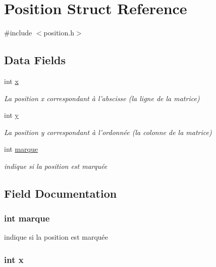 \hypertarget{struct_position}{\section{Position Struct Reference}
\label{struct_position}
}


{\ttfamily \#include $<$position.\-h$>$}

\subsection*{Data Fields}
\begin{DoxyCompactItemize}
\item 
int \hyperlink{struct_position_a6150e0515f7202e2fb518f7206ed97dc}{x}
\begin{DoxyCompactList}\small\item\em La position x correspondant à l'abscisse (la ligne de la matrice) \end{DoxyCompactList}\item 
int \hyperlink{struct_position_a0a2f84ed7838f07779ae24c5a9086d33}{y}
\begin{DoxyCompactList}\small\item\em La position y correspondant à l'ordonnée (la colonne de la matrice) \end{DoxyCompactList}\item 
int \hyperlink{struct_position_ace542d9352425b4ca6966353f6d656cf}{marque}
\begin{DoxyCompactList}\small\item\em indique si la position est marquée \end{DoxyCompactList}\end{DoxyCompactItemize}


\subsection{Field Documentation}
\hypertarget{struct_position_ace542d9352425b4ca6966353f6d656cf}{
\subsubsection[{marque}]{\setlength{\rightskip}{0pt plus 5cm}int marque}}\label{struct_position_ace542d9352425b4ca6966353f6d656cf}


indique si la position est marquée 

\hypertarget{struct_position_a6150e0515f7202e2fb518f7206ed97dc}{
\subsubsection[{x}]{\setlength{\rightskip}{0pt plus 5cm}int x}}\label{struct_position_a6150e0515f7202e2fb518f7206ed97dc}


